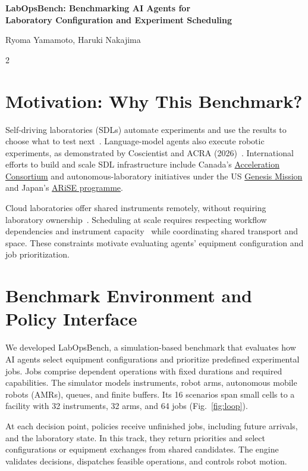 \documentclass[10pt,a4paper]{article}
\begin{document}
\fontsize{10}{12}\selectfont
{\centering
  {\fontsize{16}{17.5}\selectfont\bfseries LabOpsBench: Benchmarking AI Agents for\\
  Laboratory Configuration and Experiment Scheduling\par}
  \vspace{2pt}
  {\normalsize Ryoma Yamamoto, Haruki Nakajima\par}
}
\vspace{3pt}

\begin{multicols}{2}
\section{Motivation: Why This Benchmark?}
Self-driving laboratories (SDLs) automate experiments and use the results to choose what to test next~\cite{tom2024}.
Language-model agents also execute robotic experiments, as demonstrated by Coscientist and ACRA (2026)~\cite{boiko2023,pagel2026}.
International efforts to build and scale SDL infrastructure include Canada's \href{https://acceleration.utoronto.ca/news/u-of-t-receives-200-million-grant-to-support-acceleration-consortiums-self-driving-labs-research}{\textcolor{accent}{Acceleration Consortium}} and autonomous-laboratory initiatives under the US \href{https://www.cmu.edu/news/stories/archives/2026/july/connecting-autonomous-laboratories-to-speed-scientific-advancement}{\textcolor{accent}{Genesis Mission}} and Japan's \href{https://www.jst.go.jp/program/arise/pdf/arise_siryo_st.pdf\#page=8}{\textcolor{accent}{ARiSE programme}}.

Cloud laboratories offer shared instruments remotely, without requiring laboratory ownership~\cite{arias2024}.
Scheduling at scale requires respecting workflow dependencies and instrument capacity~\cite{zhou2026} while coordinating shared transport and space.
These constraints motivate evaluating agents' equipment configuration and job prioritization.

\columnbreak
\section{Benchmark Environment and Policy Interface}
We developed LabOpsBench, a simulation-based benchmark that evaluates how AI agents select equipment configurations and prioritize predefined experimental jobs.
Jobs comprise dependent operations with fixed durations and required capabilities.
The simulator models instruments, robot arms, autonomous mobile robots (AMRs), queues, and finite buffers.
Its 16 scenarios span small cells to a facility with 32 instruments, 32 arms, and 64 jobs (Fig.~\ref{fig:loop}).

At each decision point, policies receive unfinished jobs, including future arrivals, and the laboratory state.
In this track, they return priorities and select configurations or equipment exchanges from shared candidates.
The engine validates decisions, dispatches feasible operations, and controls robot motion.
\end{multicols}
\end{document}
